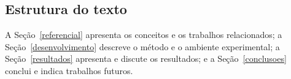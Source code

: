 \subsection{Estrutura do texto}

A Seção~\ref{referencial} apresenta os conceitos e os trabalhos relacionados; a Seção~\ref{desenvolvimento} descreve o método e o ambiente experimental; a Seção~\ref{resultados} apresenta e discute os resultados; e a Seção~\ref{conclusoes} conclui e indica trabalhos futuros.
